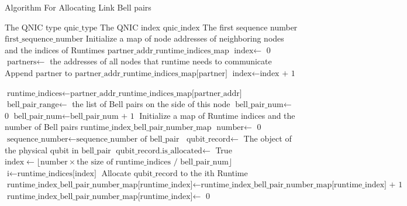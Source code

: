 \begin{algorithm}[H]  
  \begin{minipage}{0.8\linewidth}
  \caption{Algorithm For Allocating Link Bell pairs}                 
  \begin{algorithmic}[1]
    \Require The QNIC type $\text{qnic\_type}$
    \Require The QNIC index $\text{qnic\_index}$
    \Require The first sequence number $\text{first\_sequence\_number}$
    \State Initialize a map of node addresses of neighboring nodes and the indices of Runtimes $\text{partner\_addr\_runtime\_indices\_map}$
    \State $\text{index} \gets$ 0
      \State $\text{partners} \gets$ the addresses of all nodes that $\text{runtime}$ needs to communicate
        \State Append $\text{partner}$ to $\text{partner\_addr\_runtime\_indices\_map[partner]}$
      \EndFor
      \State $\text{index} \gets \text{index + 1}$
    \EndFor

      \State $\text{runtime\_indices} \gets \text{partner\_addr\_runtime\_indices\_map[partner\_addr]}$
      \State $\text{bell\_pair\_range} \gets$ the list of Bell pairs on the side of this node
      \State $\text{bell\_pair\_num} \gets$ 0
        \State $\text{bell\_pair\_num} \gets \text{bell\_pair\_num + 1}$
      \EndFor
      \State  Initialize a map of Runtime indices and the number of Bell pairs $\text{runtime\_index\_bell\_pair\_number\_map}$
      \State $\text{number} \gets$ 0
        \State $\text{sequence\_number} \gets \text{sequence\_number of bell\_pair}$
          \State $\text{qubit\_record} \gets$ The object of the physical qubit in $\text{bell\_pair}$
            \State $\text{qubit\_record.is\_allocated} \gets$ True
            \State $\text{index} \gets \lfloor \text{number} \times \text{the size of runtime\_indices / bell\_pair\_num} \rfloor$
            \State $\text{i} \gets \text{runtime\_indices[index]}$
            \State Allocate $\text{qubit\_record}$ to the ith Runtime
              \State $\text{runtime\_index\_bell\_pair\_number\_map[runtime\_index]} \gets \text{runtime\_index\_bell\_pair\_number\_map[runtime\_index] + 1}$
            \Else
              \State $\text{runtime\_index\_bell\_pair\_number\_map[runtime\_index]} \gets$ 0
            \EndIf
          \end{algorithmic}
        \end{minipage}
        \end{algorithm}
    
